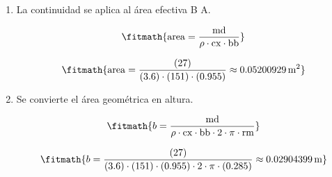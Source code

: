 \begin{enumerate}

\item La continuidad se aplica al área efectiva B A.

\[\fitmath{\mathrm{area}=\frac{\mathrm{md}}{\rho\cdot \mathrm{cx}\cdot \mathrm{bb}}}\]

\[\fitmath{\mathrm{area}=\frac{(27)}{(3.6)\cdot (151)\cdot (0.955)}\approx 0.05200929\,\mathrm{m^{2}}}\]

\item Se convierte el área geométrica en altura.

\[\fitmath{b=\frac{\mathrm{md}}{\rho\cdot \mathrm{cx}\cdot \mathrm{bb}\cdot 2\cdot \pi\cdot \mathrm{rm}}}\]

\[\fitmath{b=\frac{(27)}{(3.6)\cdot (151)\cdot (0.955)\cdot 2\cdot \pi\cdot (0.285)}\approx 0.02904399\,\mathrm{m}}\]

\end{enumerate}
